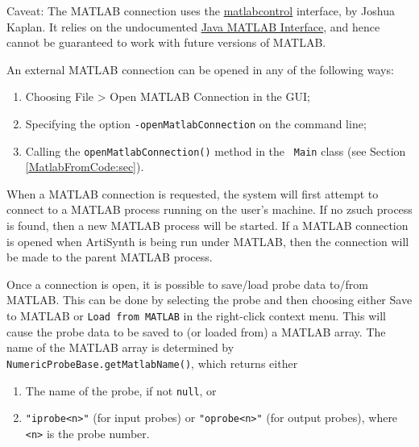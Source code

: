 \documentclass{article}
\begin{document}
\begin{sideblock}
Caveat: The MATLAB connection uses the
\href{https://code.google.com/p/matlabcontrol}{matlabcontrol}
interface, by Joshua Kaplan. It relies on the undocumented
\href{https://code.google.com/p/wiki/JMI}{Java MATLAB Interface}, and
hence cannot be guaranteed to work with future versions of MATLAB.
\end{sideblock}

An external MATLAB connection can be opened in any of the following
ways:

\begin{enumerate}

\item Choosing {\sf File > Open MATLAB Connection} in the GUI;

\item Specifying the option {\tt -openMatlabConnection} on
the command line;

\item Calling the {\tt openMatlabConnection()} method in the {\tt
Main} class (see Section \ref{MatlabFromCode:sec}).

\end{enumerate}

\begin{sideblock}
When a MATLAB connection is requested, the system will first attempt
to connect to a MATLAB process running on the user's machine. If no
zsuch process is found, then a new MATLAB process will be started.  If
a MATLAB connection is opened when ArtiSynth is being run under
MATLAB, then the connection will be made to the parent MATLAB process.
\end{sideblock}

Once a connection is open, it is possible to save/load probe data
to/from MATLAB. This can be done by selecting the probe and then
choosing either {\sf Save to MATLAB} or {\tt Load from MATLAB} in the
right-click context menu. This will cause the probe data to be saved
to (or loaded from) a MATLAB array. The name of the MATLAB array is
determined by {\tt NumericProbeBase.getMatlabName()}, which returns
either

\begin{enumerate}

\item The name of the probe, if not {\tt null}, or

\item {\tt "iprobe<n>"} (for input probes) or {\tt "oprobe<n>"} (for
output probes), where {\tt <n>} is the probe number.

\end{enumerate}
\end{document}
